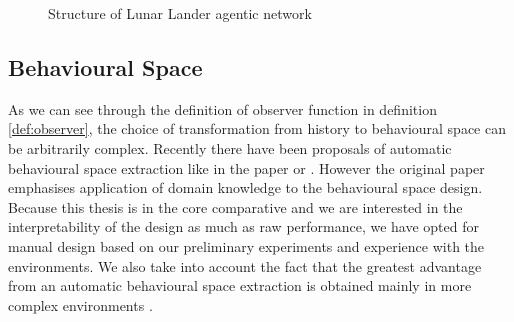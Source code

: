 \begin{figure}[h]
	\centering
	
	\caption{Structure of Lunar Lander agentic network}
	\label{fig:lunarlanderNN}
\end{figure}

\subsection{Behavioural Space}
\label{sec:behavioralSpace}
As we can see through the definition of observer function in definition \ref{def:observer}, the choice of transformation from history to behavioural space can be arbitrarily complex.
Recently there have been proposals of automatic behavioural space extraction like in the paper \cite{behaviorCharML} or \cite{Salehi_2021} . However the original paper \cite{noveltyarticle} emphasises application of domain knowledge to the behavioural space design. Because this thesis is in the core comparative and we are interested in the interpretability of the design as much as raw performance, we have opted for manual design based on our preliminary experiments and experience with the environments. We also take into account the fact that the greatest advantage from an automatic behavioural space extraction is obtained mainly in more complex environments \citep{behaviorCharML}. 

